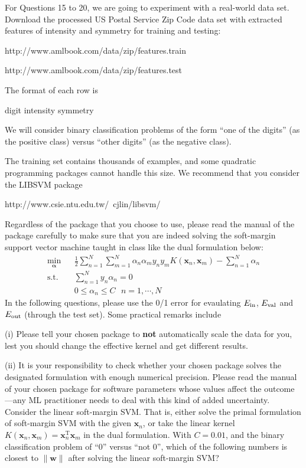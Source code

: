 \documentclass[a4paper,10pt]{exam}
\begin{document}
\begin{questions}
  \question For Questions 15 to 20, we are going to experiment with a real-world data set. Download the processed US Postal Service Zip Code data set with extracted features of intensity and symmetry for training and testing:
  
  http://www.amlbook.com/data/zip/features.train
  
  http://www.amlbook.com/data/zip/features.test
  
  The format of each row is
  
  digit intensity symmetry 
  
  We will consider binary classification problems of the form ``one of the digits'' (as the positive class) versus ``other digits'' (as the negative class).
  
  The training set contains thousands of examples, and some quadratic programming packages cannot handle this size. We recommend that you consider the LIBSVM package
  
  http://www.csie.ntu.edu.tw/~cjlin/libsvm/
  
  Regardless of the package that you choose to use, please read the manual of the package carefully to make sure that you are indeed solving the soft-margin support vector machine taught in class like the dual formulation below:
  \begin{eqnarray*}
  	\min_{\boldsymbol\alpha} && 
  	\frac{1}{2} \sum_{n=1}^N \sum_{m=1}^N \alpha_n \alpha_m y_n y_m K(\mathbf{x}_n, \mathbf{x}_m)
  	- \sum_{n=1}^N \alpha_n \\
  	\mathrm{s.t.}        && \sum_{n=1}^N y_n \alpha_n = 0 \\ 
  	&& 0 \leq \alpha_n \leq C \ \ \ n=1,\cdots,N
  \end{eqnarray*}
  In the following questions, please use the 0/1 error for evaulating $E_{\rm in}$, $E_{\rm val}$ and $E_{\rm out}$ (through the test set). Some practical remarks include
  
  (i) Please tell your chosen package to \textbf {not} automatically scale the data for you, lest you should change the effective kernel and get different results.
  
  (ii) It is your responsibility to check whether your chosen package solves the designated formulation with enough numerical precision. Please read the manual of your chosen package for software parameters whose values affect the outcome---any ML practitioner needs to deal with this kind of added uncertainty.
  Consider the linear soft-margin SVM. That is, either solve the primal formulation of soft-margin SVM with the given $\mathbf{x}_n$, or take the linear kernel $K(\mathbf{x}_n,\mathbf{x}_m) = \mathbf{x}_n^{\mathrm{T}} \mathbf{x}_m$ in the dual formulation. With $C=0.01$, and the binary classification problem of ``0'' versus ``not 0'', which of the following numbers is closest to $\|\mathbf{w}\|$ after solving the linear soft-margin SVM?
  \begin{choices}
  	\\
  \end{choices}
  

\end{questions}
\end{document}
